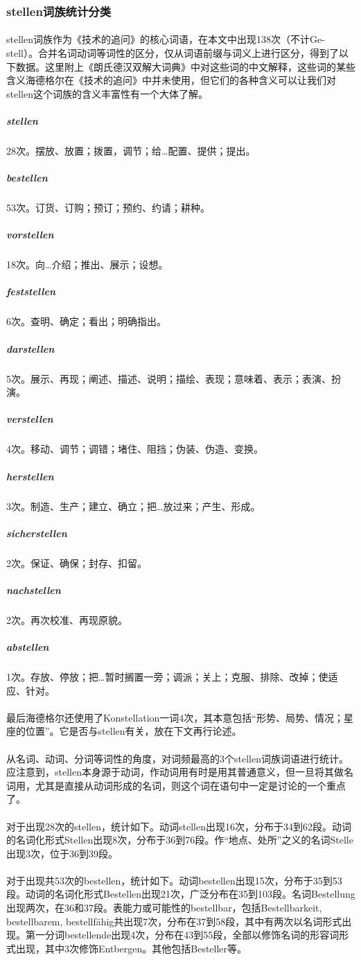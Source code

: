 \documentclass{article}
\begin{document}
		\subsubsection{stellen词族统计分类}
			\paragraph{}
			stellen词族作为《技术的追问》的核心词语，在本文中出现138次（不计Ge-stell）。合并名词动词等词性的区分，仅从词语前缀与词义上进行区分，得到了以下数据。这里附上《朗氏德汉双解大词典》中对这些词的中文解释，这些词的某些含义海德格尔在《技术的追问》中并未使用，但它们的各种含义可以让我们对stellen这个词族的含义丰富性有一个大体了解。
			\subparagraph{stellen}
			28次。摆放、放置；拨置，调节；给…配置、提供；提出。
			\subparagraph{bestellen}
			53次。订货、订购；预订；预约、约请；耕种。
			\subparagraph{vorstellen}
			18次。向…介绍；推出、展示；设想。
			\subparagraph{feststellen}
			6次。查明、确定；看出；明确指出。
			\subparagraph{darstellen}
			5次。展示、再现；阐述、描述、说明；描绘、表现；意味着、表示；表演、扮演。
			\subparagraph{verstellen}
			4次。移动、调节；调错；堵住、阻挡；伪装、伪造、变换。
			\subparagraph{herstellen}
			3次。制造、生产；建立、确立；把…放过来；产生、形成。
			\subparagraph{sicherstellen}
			2次。保证、确保；封存、扣留。
			\subparagraph{nachstellen}
			2次。再次校准、再现原貌。
			\subparagraph{abstellen}
			1次。存放、停放；把…暂时搁置一旁；调派；关上；克服、排除、改掉；使适应、针对。
			\paragraph{}			
			最后海德格尔还使用了Konstellation一词4次，其本意包括“形势、局势、情况；星座的位置”。它是否与stellen有关，放在下文再行论述。
			\paragraph{}	
			从名词、动词、分词等词性的角度，对词频最高的3个stellen词族词语进行统计。应注意到，stellen本身源于动词，作动词用有时是用其普通意义，但一旦将其做名词用，尤其是直接从动词形成的名词，则这个词在语句中一定是讨论的一个重点了。
			\paragraph{}	
对于出现28次的stellen，统计如下。动词stellen出现16次，分布于34到62段。动词的名词化形式Stellen出现8次，分布于36到76段。作“地点、处所”之义的名词Stelle出现3次，位于36到39段。
			\paragraph{}	
对于出现共53次的bestellen，统计如下。动词bestellen出现15次，分布于35到53段。动词的名词化形式Bestellen出现21次，广泛分布在35到103段。名词Bestellung出现两次，在36和37段。表能力或可能性的bestellbar，包括Bestellbarkeit, bestellbarem, bestellfähig共出现7次，分布在37到58段，其中有两次以名词形式出现。第一分词bestellende出现4次，分布在43到55段，全部以修饰名词的形容词形式出现，其中3次修饰Entbergen。其他包括Besteller等。
\end{document}
